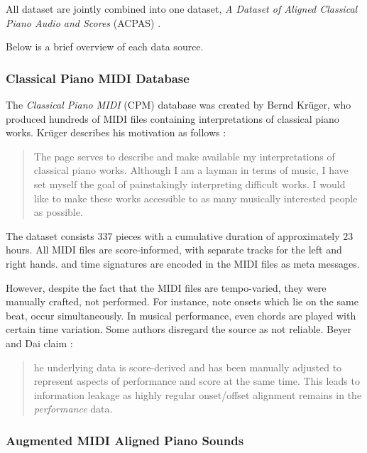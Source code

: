 All dataset are jointly combined into one dataset, \emph{A Dataset of Aligned Classical Piano Audio and Scores} (ACPAS) \cite{Liu2021}.

Below is a brief overview of each data source.

\subsubsection{Classical Piano MIDI Database}

The \emph{Classical Piano MIDI} (CPM) database was created by Bernd Krüger, who produced hundreds of MIDI files containing interpretations of classical piano works. Krüger describes his motivation as follows \cite{Krueger1996}:

\begin{quote}The page serves to describe and make available my interpretations of classical piano works. Although I am a layman in terms of music, I have set myself the goal of painstakingly interpreting difficult works. I would like to make these works accessible to as many musically interested people as possible.\end{quote}

The dataset consists 337 pieces with a cumulative duration of approximately $23$ hours. All MIDI files are score-informed, with separate tracks for the left and right hands.  and time signatures are encoded in the MIDI files as meta messages.

However, despite the fact that the MIDI files are tempo-varied, they were manually crafted, not performed. For instance, note onsets which lie on the same beat, occur simultaneously. In musical performance, even chords are played with certain time variation. Some authors disregard the source as not reliable. Beyer and Dai claim \cite{Beyer2024}: \begin{quote}he underlying data is score-derived and has been manually adjusted to represent aspects of performance and score at the same time. This leads to information leakage as highly regular onset/offset alignment remains in the \emph{performance} data.\end{quote}

\subsubsection{Augmented MIDI Aligned Piano Sounds}

